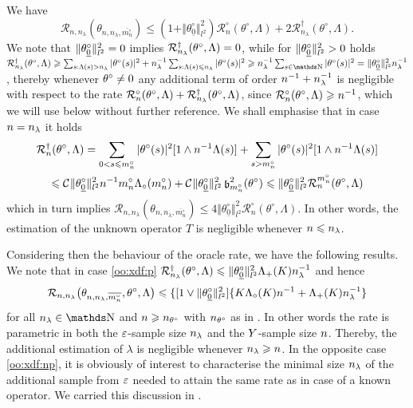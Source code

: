 \begin{rem*}
We have
\begin{equation*}
\mathcal{R}_{n, n_{\lambda}}(\theta_{n, n_{\lambda}, \overline{m_{n}^{\circ}}}) \leq (1 + \Vert \theta^{\circ}_{\underline{0}} \Vert_{l^{2}}^{2})\mathcal{R}_{n}^{\circ}(\theta^{\circ}, \Lambda) + 2 \mathcal{R}_{n_{\lambda}}^{\dagger}(\theta^{\circ}, \Lambda).
\end{equation*}
We note that $\Vnormlp{\xdf_{\underline{0}}}^2=0$ implies
  $\mRa{\xdf,\Lambda}=0$, while for $\Vnormlp{\xdf_{\underline{0}}}^2>0$ holds
  $\mRa{\xdf,\Lambda}\geq \sum_{s:\iSv[s]>\ssE} \vert \fxdf[(s)] \vert ^2+\ssE^{-1}\sum_{s:\iSv[s]\leq\ssE} \vert \fxdf[(s)] \vert ^2  \geq\ssE^{-1}\sum_{s\in\N} \vert \fxdf[(s)] \vert ^2=\Vnormlp{\xdf_{\underline{0}}}^2
  \ssE^{-1}$, thereby whenever $\xdf\ne 0$
  any additional term of order $\ssY^{-1}+\ssE^{-1}$
  is negligible with respect to the rate
  $\oRa{\xdf,\Lambda}+\mRa{\xdf,\Lambda}$, since
  $\oRa{\xdf,\Lambda}\geq \ssY^{-1}$, 
  which we will use below without further reference. We shall
  emphasise that in case $\ssY=\ssE$ it holds
  \begin{multline}
    \mRa[\ssY]{\xdf,\Lambda}=\sum_{0 < s \leq m_{n}^{\circ}} \vert \fxdf[(s)] \vert^2 [1 \wedge \ssY^{-1}\iSv[s]]
    + \sum_{s > m_{n}^{\circ}} \vert \fxdf[(s)] \vert ^2[1\wedge\ssY^{-1}\iSv[s]]\\
    \leq \cst{}\Vnormlp{\xdf_{\underline{0}}}^2 \ssY^{-1} \oDi{\ssY}
    \oiSv[\oDi{\ssY}] +
    \cst{}\Vnormlp{\xdf_{\underline{0}}}^2\bias[\oDi{\ssY}]^2(\theta^{\circ})\leq
    \Vnormlp{\xdf_{\underline{0}}}^2\dRa{\oDi{\ssY}}{\xdf,\Lambda}
  \end{multline}
  which in turn implies $\mathcal{R}_{n, n_{\lambda}}(\theta_{n, n_{\lambda}, \overline{m_{n}^{\circ}}}) \leq 4 \Vert \theta^{\circ}_{\underline{0}} \Vert_{l^{2}}^{2}\mathcal{R}_{n}^{\circ}(\theta^{\circ}, \Lambda)$.
  In other words, the estimation of the unknown operator $T$ is negligible whenever $\ssY\leq\ssE$.
  
  \medskip
  
Considering then the behaviour of the oracle rate, we have the following results.
We note that in case \ref{oo:xdf:p}
$\mRa{\xdf,\Lambda}\leq
\Vnormlp{\xdf_{\underline{0}}}^2\miSv[K]\ssE^{-1}$
and hence
\begin{equation}
 \nmRi{\hxdfPr[\oDi{\ssY}]}{\xdf,\Lambda}
 \leq
\{[1\vee\Vnormlp{\xdf_{\underline{0}}}^2]\{
K\oiSv[K]\ssY^{-1}+\miSv[K]\ssE^{-1}\}
\end{equation}
for all $\ssE\in\N$ and $\ssY\geq\ssY_{\xdf}$ with $\ssY_{\xdf}$ as in . In other words the
rate is parametric in both the $\rE$-sample size $\ssE$ and the $\rY$-sample size $\ssY$. Thereby, the  additional estimation of $\lambda$ is negligible whenever $\ssE\geq\ssY$.  In the
opposite case \ref{oo:xdf:np}, it is obviously of interest to characterise the minimal size $\ssE$ of the additional
sample from $\rE$ needed to attain the same rate as in case of a known
operator. We carried this discussion in .


\end{rem*}
